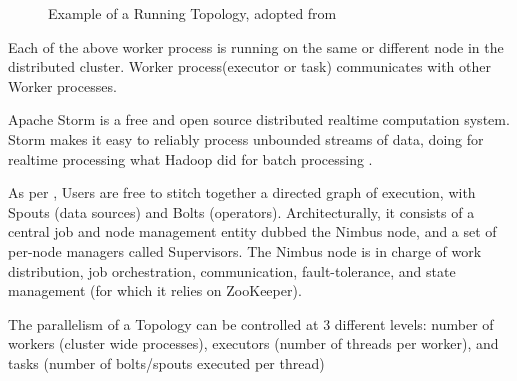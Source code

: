 \documentclass[9pt,twocolumn,twoside]{styles/osajnl}
\begin{document}
\begin{figure}[htbp]
	\centering
	\caption{Example of a Running Topology, adopted from
	\cite{www-noll2012-parallelismofstormtopology} }
	\label{fig:Storm_example_of_a_running_topology}
\end{figure}


Each of the above worker process is running on the same or different
node in the distributed cluster. Worker process(executor or task)
communicates with other Worker processes.

Apache Storm is a free and open source distributed realtime
computation system. Storm makes it easy to reliably process unbounded
streams of data, doing for realtime processing what Hadoop did for
batch processing \cite{www-storm}.

As per \cite{article-nabi2014streams}, Users are free to stitch
together a directed graph of execution, with Spouts (data sources) and
Bolts (operators). Architecturally, it consists of a central job and
node management entity dubbed the Nimbus node, and a set of per-node
managers called Supervisors. The Nimbus node is in charge of work
distribution, job orchestration, communication, fault-tolerance, and
state management (for which it relies on ZooKeeper).

The parallelism of a Topology can be controlled at 3 different levels:
number of workers (cluster wide processes), executors (number of
threads per worker), and tasks (number of bolts/spouts executed per
thread)
\end{document}
